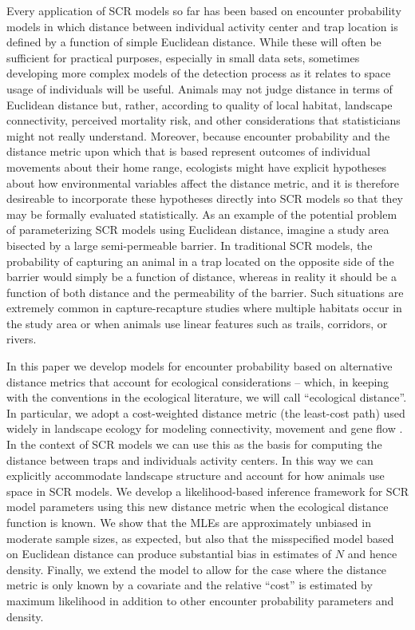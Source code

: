 \documentclass[12pt]{article}
\begin{document}
Every application of SCR models so far has been based on encounter
probability models in which distance between individual activity
center and trap location is defined by a function of simple Euclidean
distance.  While these will often be sufficient for practical
purposes, especially in small data sets, sometimes developing more
complex models of the detection process as it relates to space usage
of individuals will be useful.  Animals may not judge distance in
terms of Euclidean distance but, rather, according to quality of local
habitat, landscape connectivity, perceived mortality risk, and other
considerations that statisticians might not really
understand. Moreover, because encounter probability and the distance
metric upon which that is based represent outcomes of individual
movements about their home range, ecologists might have explicit
hypotheses about how environmental variables affect the distance
metric, and it is therefore desireable to incorporate these hypotheses
directly into SCR models so that they may be formally evaluated
statistically.
As an example of the potential problem of parameterizing SCR models
using Euclidean distance, imagine a study area bisected by a large
semi-permeable barrier. In traditional SCR models, the probability of
capturing an animal in a trap located on the opposite side of the
barrier would simply be a function of distance, whereas in reality it
should be a function of both distance and the permeability of the
barrier. Such situations are extremely common in capture-recapture
studies where multiple habitats occur in the study area or when
animals use linear features such as trails, corridors, or rivers.

In this paper we develop models for encounter probability based on
alternative distance metrics that account for ecological
considerations -- which, in keeping with the conventions in the
ecological literature, we will call ``ecological distance''. In
particular, we adopt a cost-weighted distance metric (the least-cost path)
used widely in landscape ecology for modeling connectivity,
movement and gene flow
\citep{adriaensen_etal:2003,manel_etal:2003,mcrae_etal:2008}. In the
context of SCR models we can use this as the basis for computing the
distance between traps and individuals activity centers. In this way
we can explicitly accommodate landscape structure and
account for how animals use space in SCR models. We develop a
likelihood-based inference framework for SCR model parameters using
this new distance metric when the ecological distance function is
known.  We show that the MLEs are approximately unbiased in moderate
sample sizes, as expected, but also that the misspecified model based
on Euclidean distance can produce substantial bias in estimates of $N$
and hence density.  Finally, we extend the model to allow for the case
where the distance metric is only known by a covariate and the
relative ``cost'' is estimated by maximum likelihood in addition to
other encounter probability parameters and density.
\end{document}
